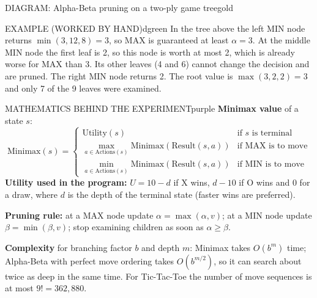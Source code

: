 \documentclass[11pt,a4paper]{article}
\newenvironment{example}{\begin{secbox}{EXAMPLE (WORKED BY HAND)}{dgreen}}{\end{secbox}}
\newenvironment{maths}{\begin{secbox}{MATHEMATICS BEHIND THE EXPERIMENT}{purple}}{\end{secbox}}
\newenvironment{diagram}[1]{\begin{secbox}{DIAGRAM: #1}{gold}\centering}{\end{secbox}}
\begin{document}
\begin{diagram}{Alpha-Beta pruning on a two-ply game tree}
\end{diagram}

\begin{example}
In the tree above the left MIN node returns $\min(3,12,8)=3$, so MAX is guaranteed at least $\alpha=3$. At the middle MIN node the first leaf is 2, so this node is worth at most 2, which is already worse for MAX than 3. Its other leaves (4 and 6) cannot change the decision and are pruned. The right MIN node returns 2. The root value is $\max(3,2,2)=3$ and only 7 of the 9 leaves were examined.
\end{example}

\begin{maths}
\textbf{Minimax value} of a state $s$:
\[ \mathrm{Minimax}(s)=\begin{cases}
\mathrm{Utility}(s) & \text{if } s \text{ is terminal}\\[2pt]
\max_{a\in \mathrm{Actions}(s)} \mathrm{Minimax}(\mathrm{Result}(s,a)) & \text{if MAX is to move}\\[2pt]
\min_{a\in \mathrm{Actions}(s)} \mathrm{Minimax}(\mathrm{Result}(s,a)) & \text{if MIN is to move}
\end{cases} \]
\textbf{Utility used in the program:} $U = 10-d$ if X wins, $d-10$ if O wins and $0$ for a draw, where $d$ is the depth of the terminal state (faster wins are preferred).

\textbf{Pruning rule:} at a MAX node update $\alpha=\max(\alpha,v)$; at a MIN node update $\beta=\min(\beta,v)$; stop examining children as soon as $\alpha\ge\beta$.

\textbf{Complexity} for branching factor $b$ and depth $m$: Minimax takes $O(b^{m})$ time; Alpha-Beta with perfect move ordering takes $O(b^{m/2})$, so it can search about twice as deep in the same time. For Tic-Tac-Toe the number of move sequences is at most $9! = 362{,}880$.
\end{maths}
\end{document}
